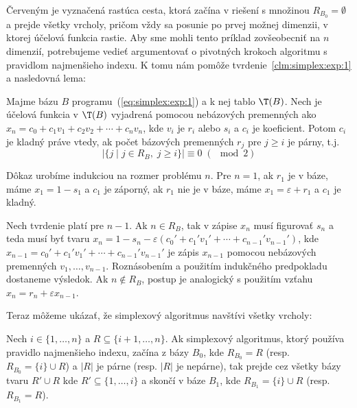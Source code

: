 \noindent
Červeným je vyznačená rastúca cesta, ktorá začína v riešení s množinou $R_{B_0}=\emptyset$ a prejde všetky vrcholy,
pričom vždy sa posunie po prvej možnej dimenzii, v ktorej účelová funkcia rastie. 
Aby sme mohli tento príklad zovšeobecniť na $n$ dimenzií, potrebujeme vedieť argumentovať o pivotných krokoch
algoritmu s pravidlom najmenšieho indexu. K tomu nám pomôže tvrdenie~\ref{clm:simplex:exp:1}
a nasledovná lema:

\begin{lema}
  \label{lm:simplex:exp:1}
  Majme bázu $B$ programu~(\ref{eq:simplex:exp:1}) a k nej tablo $\T(B)$. Nech je účelová funkcia 
  v $\T(B)$ vyjadrená pomocou
  nebázových premenných ako 
  $x_n=c_0+c_1v_1+c_2v_2+\cdots+c_nv_n$, kde $v_i$ je $r_i$ alebo $s_i$ a $c_i$ je koeficient.
  Potom $c_i$ je kladný práve vtedy, ak počet bázových premenných $r_j$ pre $j\ge i$ je párny, t.j.
  $$\left|\{j\mid j\in R_B,\;j\ge i\}\right|\equiv 0\; (\mod 2)$$
\end{lema}

\begin{dokaz}
  Dôkaz urobíme indukciou na rozmer problému $n$. Pre $n=1$, ak $r_1$ je v báze, máme
  $x_1=1-s_1$ a $c_1$ je záporný, ak $r_1$ nie je v báze, máme $x_1=\varepsilon+r_1$ a $c_1$ je kladný.

  \noindent
  Nech tvrdenie platí pre $n-1$. Ak $n\in R_B$, tak v zápise $x_n$ musí figurovať $s_n$ a teda
  musí byť tvaru $x_n=1-s_n-\varepsilon (c_0'+c_1'v_1'+\cdots+c_{n-1}'v_{n-1}')$, kde
  $x_{n-1}=c_0'+c_1'v_1'+\cdots+c_{n-1}'v_{n-1}'$ je zápis $x_{n-1}$ pomocou nebázových premenných 
  $v_1,\ldots,v_{n-1}$. Roznásobením a použitím indukčného predpokladu dostaneme výsledok.
  Ak $n\not\in R_B$, postup je analogický s použitím vzťahu $x_n=r_n+\varepsilon x_{n-1}$.
\end{dokaz}

\noindent
Teraz môžeme ukázať, že simplexový algoritmus navštívi všetky vrcholy:

\begin{veta}
  Nech $i\in\{1,\ldots,n\}$ a 
  $R\subseteq\{i+1,\ldots,n\}$. Ak simplexový algoritmus, ktorý používa pravidlo najmenšieho indexu,
  začína z bázy $B_0$, kde $R_{B_0}=R$ 
  (resp. $R_{B_0}=\{i\}\cup R$) a $|R|$ je párne (resp. $|R|$ je nepárne),
  tak prejde cez všetky bázy tvaru  $R'\cup R$ kde $R'\subseteq\{1,\ldots,i\}$ a skončí v báze
  $B_1$, kde $R_{B_1}=\{i\}\cup R$ (resp. $R_{B_1}=R$).
\end{veta}

